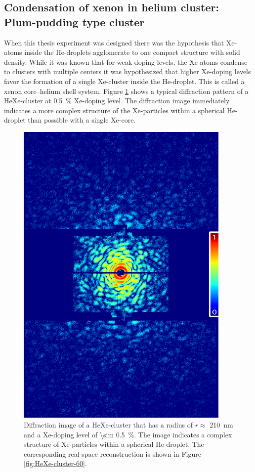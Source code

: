\subsection{Condensation of xenon in helium cluster: Plum-pudding type cluster}\label{sec:helium-data}
%
When this thesis experiment was designed there was the hypothesis that Xe-atoms inside the He-droplets agglomerate to one compact structure with solid density. While it was known that for weak doping levels, the Xe-atoms condense to clusters with multiple centers \cite{Loginov-2011-PRL,Gomez-2014-Science} it was hypothesized that higher Xe-doping levels favor the formation of a single Xe-cluster inside the He-droplet. This is called a xenon core--helium shell system. Figure \ref{fig:HeXe-cluster-diff-patttern} shows a typical diffraction pattern of a HeXe-cluster at \SI{0.5}{\percent} Xe-doping level. The diffraction image immediately indicates a more complex structure of the Xe-particles within a spherical He-droplet than possible with a single Xe-core.
%
\begin{figure}
 	\centering
 		\includegraphics[width=0.93\textwidth]{images/results/HeXediffPattern-113-05-doping-diffpattern2.png}
 	\caption[Diffraction image of HeXe-cluster at \SI{0.5}{\percent} Xe-doping.]{Diffraction image of a HeXe-cluster that has a radius of $r\approx$ \SI{210}{\nano\meter} and a Xe-doping level of \SI{\sim 0.5}{\percent}. The image indicates a complex structure of Xe-particles within a spherical He-droplet. The corresponding real-space reconstruction is shown in Figure \ref{fig:HeXe-cluster-60}.}
 	\label{fig:HeXe-cluster-diff-patttern}
\end{figure}
